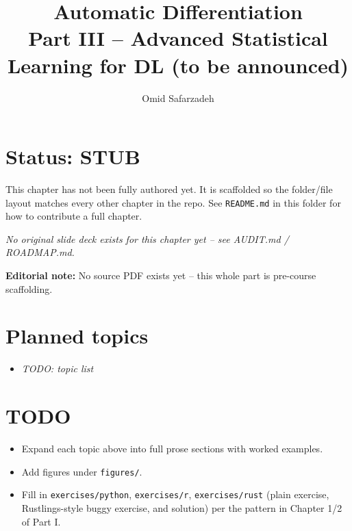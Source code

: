 \documentclass[11pt]{article}
\title{Automatic Differentiation \\ \large Part III -- Advanced Statistical Learning for DL (to be announced)}
\author{Omid Safarzadeh}
\date{}
\begin{document}
\maketitle

\section*{Status: STUB}
This chapter has not been fully authored yet. It is scaffolded so the
folder/file layout matches every other chapter in the repo. See
\texttt{README.md} in this folder for how to contribute a full chapter.

\textit{No original slide deck exists for this chapter yet -- see AUDIT.md / ROADMAP.md.}

\par\noindent\textbf{Editorial note:} No source PDF exists yet -- this whole part is pre-course scaffolding.

\section*{Planned topics}
\begin{itemize}
  \item \textit{TODO: topic list}
\end{itemize}

\section*{TODO}
\begin{itemize}
  \item Expand each topic above into full prose sections with worked examples.
  \item Add figures under \texttt{figures/}.
  \item Fill in \texttt{exercises/python}, \texttt{exercises/r}, \texttt{exercises/rust}
        (plain exercise, Rustlings-style buggy exercise, and solution) per the
        pattern in Chapter 1/2 of Part I.
\end{itemize}
\end{document}
